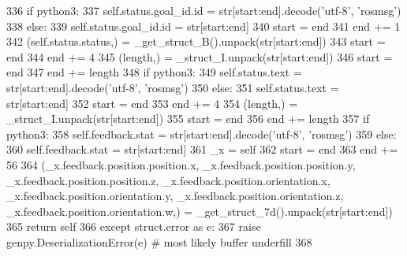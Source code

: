 \begin{DoxyCode}
336       \textcolor{keywordflow}{if} python3:
337         self.status.goal\_id.id = str[start:end].decode(\textcolor{stringliteral}{'utf-8'}, \textcolor{stringliteral}{'rosmsg'})
338       \textcolor{keywordflow}{else}:
339         self.status.goal\_id.id = str[start:end]
340       start = end
341       end += 1
342       (self.status.status,) = \_get\_struct\_B().unpack(str[start:end])
343       start = end
344       end += 4
345       (length,) = \_struct\_I.unpack(str[start:end])
346       start = end
347       end += length
348       \textcolor{keywordflow}{if} python3:
349         self.status.text = str[start:end].decode(\textcolor{stringliteral}{'utf-8'}, \textcolor{stringliteral}{'rosmsg'})
350       \textcolor{keywordflow}{else}:
351         self.status.text = str[start:end]
352       start = end
353       end += 4
354       (length,) = \_struct\_I.unpack(str[start:end])
355       start = end
356       end += length
357       \textcolor{keywordflow}{if} python3:
358         self.feedback.stat = str[start:end].decode(\textcolor{stringliteral}{'utf-8'}, \textcolor{stringliteral}{'rosmsg'})
359       \textcolor{keywordflow}{else}:
360         self.feedback.stat = str[start:end]
361       \_x = self
362       start = end
363       end += 56
364       (\_x.feedback.position.position.x, \_x.feedback.position.position.y, \_x.feedback.position.position.z, 
      \_x.feedback.position.orientation.x, \_x.feedback.position.orientation.y, \_x.feedback.position.orientation.z, 
      \_x.feedback.position.orientation.w,) = \_get\_struct\_7d().unpack(str[start:end])
365       \textcolor{keywordflow}{return} self
366     \textcolor{keywordflow}{except} struct.error \textcolor{keyword}{as} e:
367       \textcolor{keywordflow}{raise} genpy.DeserializationError(e)  \textcolor{comment}{# most likely buffer underfill}
368 
\end{DoxyCode}
\mbox{\label{classexp__assignment2_1_1msg_1_1__PlanningActionFeedback_1_1PlanningActionFeedback_a98361d3eb58d9970fabd6335d2587322}} 
